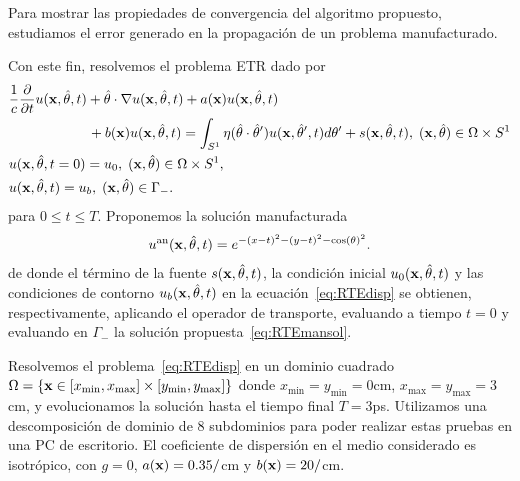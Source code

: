Para mostrar las propiedades de convergencia del algoritmo propuesto,
estudiamos el error generado en la propagación de un problema manufacturado.

Con este fin, resolvemos el problema ETR dado por 
\begin{equation*}
\begin{split}
\begin{aligned}
&\frac{1}{c}\frac{\partial }{\partial t}u(\mathbf{x},\hat{\theta},t) + \hat{\theta} \cdot \nabla u(\mathbf{x},\hat{\theta},t)+a(\mathbf{x})u(\mathbf{x},\hat{\theta},t)  \\
&\quad \quad \quad  \quad \quad \; \;\,  +b(\mathbf{x})u(\mathbf{x},\hat{\theta},t) = \int_{S^1}\eta(\hat{\theta}\cdot\hat{\theta} ') 
u(\mathbf{x},\hat \theta',t) d\theta'+s(\mathbf{x},\hat{\theta},t),  \; (\mathbf{x},\hat{\theta})  \in \Omega\times S^1\\
&u(\mathbf{x},\hat{\theta},t=0)=u_0, \; (\mathbf{x},\hat{\theta})  \in \Omega\times S^1,  \\
&u(\mathbf{x},\hat{\theta},t)=u_b, \; (\mathbf{x},\hat{\theta}) \in \Gamma_-. \notag
\end{aligned}
\end{split}
\label{eq:RTEdisp}
\end{equation*}
para $0\leq t \leq T$. Proponemos la solución manufacturada
\begin{equation*}
u^{\text{an}}(\mathbf{x},\hat{\theta},t)=e^{-(x-t)^2-(y-t)^2-\cos(\theta)^2}.
\label{eq:RTEmansol}
\end{equation*}
de donde el término de la fuente $s(\mathbf{x},\hat{\theta},t)$, 
la condición inicial $u_0(\mathbf{x},\hat{\theta},t)$ y las condiciones 
de contorno $u_b(\mathbf{x},\hat{\theta},t)$ en la ecuación~\eqref{eq:RTEdisp} 
se obtienen, respectivamente, aplicando el operador de transporte, 
evaluando a tiempo $t=0$ y evaluando en $\Gamma_-$ la solución 
propuesta~\eqref{eq:RTEmansol}.


Resolvemos el problema~\eqref{eq:RTEdisp} en un dominio cuadrado 
$\Omega=\{ \mathbf{x} \in [x_{\text{min}},x_{\text{max}}]\times [y_{\text{min}},y_{\text{max}}] \}$
donde $x_{\text{min}}=y_{\text{min}}=0$cm, $x_{\text{max}}=y_{\text{max}}=3$cm, 
y evolucionamos la solución hasta el tiempo final $T=3$ps. Utilizamos 
una descomposición de dominio de 8 subdominios para 
poder realizar estas pruebas en una PC de escritorio. 
El coeficiente de dispersión en el medio considerado es isotrópico, 
con $g=0$, $a(\mathbf{x})=0.35/$cm y $b(\mathbf{x})=20/$cm. 

\pagebreak

